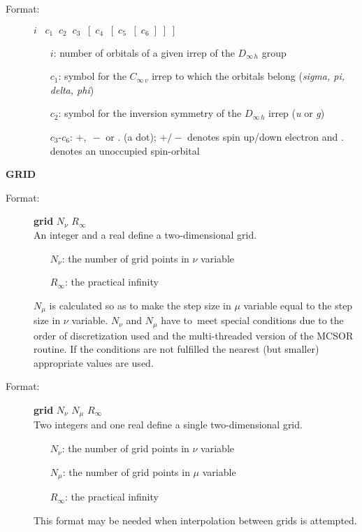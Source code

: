 \documentclass[10pt,a4paper]{article}
\begin{document}
\begin{description}
\begin{description}
\item[Format:] $i\;\;\;c_1\;\;c_2\;\;c_3\;\;[\;c_4\;\;[\;c_5\;\;[\;c_6\;]\;]\;]$
\begin{itemize}
\item[$i$:]  number of orbitals of a given irrep of the
$D_{\infty\,h}$ group
\item[$c_1$:] symbol for the $C_{\infty\,v}$ irrep to which the
orbitals belong ({\it sigma, pi, delta, phi})
\item[$c_2$:] symbol for the inversion symmetry of the $D_{\infty\,h}$
irrep ({\it u} or {\it g})
\item[$c_3$-$c_6$:] $+,\;-$ or . (a dot); $+/-$ denotes spin up/down
electron and . denotes an unoccupied spin-orbital
\end{itemize}
\end{description}

\item \textbf{GRID}

\begin{description}
\item[Format:] \textbf{grid} $N_{\nu}$ $R_{\infty}$ \\
An integer and a real define a two-dimensional grid.
\begin{itemize}
\item[$N_{\nu}$:] the number of grid points in $\nu$ variable
\item[$R_{\infty}$:] the practical infinity
\end{itemize}
$N_{\mu}$ is calculated so as to make the step size in $\mu$ variable equal
to the step size in $\nu$ variable. $N_{\nu}$ and $N_{\mu}$ have to~meet
special conditions due to the order of discretization used and
the multi-threaded version of the MCSOR routine. If the conditions are not
fulfilled the nearest (but smaller) appropriate values are used.
\end{description}

\begin{description}
\item[Format:] \textbf{grid} $N_{\nu}$ $N_{\mu}$ $R_{\infty}$ \\
Two integers and one real define a single two-dimensional grid.
\begin{itemize}
\item[$N_{\nu}$:] the number of grid points in $\nu$ variable
\item[$N_{\mu}$:] the number of grid points in $\mu$ variable
\item[$R_{\infty}$:] the practical infinity
\end{itemize}
This format may be needed when interpolation between grids is attempted.
\end{description}


\end{description}
\end{document}
